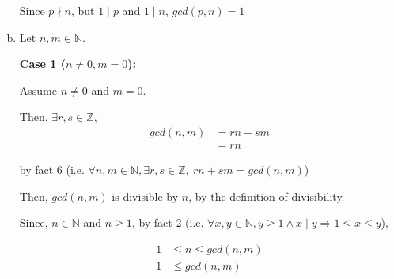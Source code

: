 \documentclass[12pt]{article}
\begin{document}
\begin{enumerate}[a.]
    Since $p \nmid n$, but $1 \mid p$ and $1 \mid n$, $gcd(p,n) = 1$

    \item

    Let $n,m \in \mathbb{N}$.

    \bigskip

    \textbf{Case 1 ($n \neq 0, m = 0$):}

    \bigskip

    Assume $n \neq 0$ and $m = 0$.

    \bigskip

    Then, $\exists r,s \in \mathbb{Z}$,
    \setcounter{equation}{0}
    \begin{align}
        gcd(n,m) &= rn + sm\\
        &= rn
    \end{align}

    by fact 6 (i.e. $\forall n,m \in \mathbb{N}, \exists r,s \in \mathbb{Z},\:
    rn + sm = gcd(n,m)$)

    \bigskip

    Then, $gcd(n,m)$ is divisible by $n$, by the definition of divisibility.

    \bigskip

    Since, $n \in \mathbb{N}$ and $n \geq 1$, by fact 2 (i.e. $\forall x,y \in
    \mathbb{N}, y \geq 1 \land x \mid y \Rightarrow 1 \leq x \leq y$),

    \begin{align}
        1 &\leq n \leq gcd(n,m)\\
        1 &\leq gcd(n,m)
    \end{align}


\end{enumerate}
\end{document}
